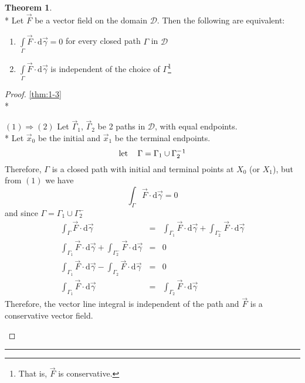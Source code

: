 \documentclass[10pt,a4paper]{report}
\theoremstyle{definition}
\newtheorem{theorem}{Theorem}[chapter]
\theoremstyle{plain}
\theoremstyle{definition}
\theoremstyle{plain}
\newcommand{\ddns}{\mathrm{d}}
\newenvironment{proofenv}{\begin{proof}}{\end{proof}{\par\centering\rule{3cm}{.1pt}\par}}
\newcommand{\mlet}{\text{let}\,}
\newcommand{\domain}{\mathcal{D}}
\renewcommand{\implies}{\Rightarrow}
\begin{document}
\begin{theorem}\label{thm:1-3}\ \\*
    Let $\vec{F}$ be a vector field on the domain $\domain$. Then the following are equivalent:
    \begin{enumerate}[1)]
    \item
        $\int\limits_\Gamma \vec{F} \cdot\ddns\vec{\gamma} = 0$ for every closed path $\Gamma$ in $\domain$
    \item
        $\int\limits_\Gamma \vec{F} \cdot\ddns\vec{\gamma}$ is independent of the choice of $\Gamma$\footnote{That is, $\vec{F}$ is conservative.}
    \end{enumerate}
\end{theorem}

\begin{proofenv} \autoref{thm:1-3}\\*
    \begin{trivlist}
        \item[$(1)\implies(2)$]
            Let $\vec{\Gamma}_1$, $\vec{\Gamma}_2$ be 2 paths in $\domain$, with equal endpoints.\\*
            Let $\vec{x}_0$ be the initial and $\vec{x}_1$ be the terminal endpoints.
            \[
                \mlet\quad \Gamma = \Gamma_1 \cup \Gamma_2^-\footnote{$\Gamma_2$ in the opposite direction}
            \]
            Therefore, $\Gamma$ is a closed path with initial and terminal points at $X_0$  (or $X_1$), but from $(1)$
            we have
            \[
                \int_\Gamma \vec{F} \cdot \ddns\vec{\gamma} = 0
            \]
            and since $\Gamma = \Gamma_1 \cup \Gamma_2^-$
            \begin{eqnarray*}
                \int_\Gamma \vec{F} \cdot \ddns\vec{\gamma} &=& \int_{\Gamma_1} \vec{F} \cdot \ddns\vec{\gamma} + \int_{\Gamma_2^-} \vec{F} \cdot \ddns\vec{\gamma} \\
                \int_{\Gamma_1} \vec{F} \cdot \ddns\vec{\gamma} + \int_{\Gamma_2^-} \vec{F} \cdot \ddns\vec{\gamma} &=& 0 \\
                \int_{\Gamma_1} \vec{F} \cdot \ddns\vec{\gamma} - \int_{\Gamma_2} \vec{F} \cdot \ddns\vec{\gamma} &=& 0 \\
                \int_{\Gamma_1} \vec{F} \cdot \ddns\vec{\gamma} &=& \int_{\Gamma_2} \vec{F} \cdot \ddns\vec{\gamma}
            \end{eqnarray*}
            Therefore, the vector line integral is independent of the path and $\vec{F}$ is a conservative vector field.
            

\end{trivlist}
\end{proofenv}
\end{document}
